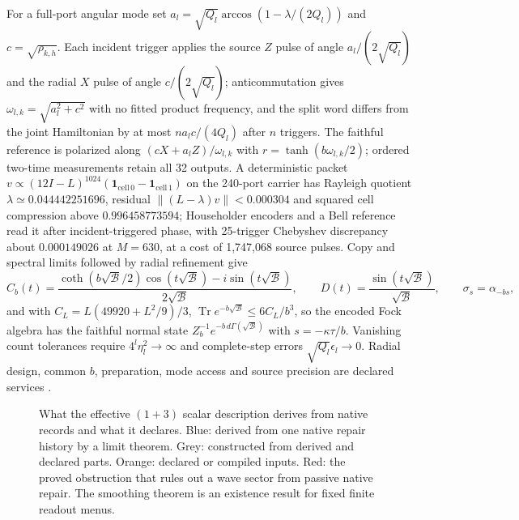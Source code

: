 \documentclass[11pt]{article}
\theoremstyle{definition}
\theoremstyle{remark}
\theoremstyle{plain}
\newcommand{\Tr}{\operatorname{Tr}}
\begin{document}
For a full-port angular mode set $a_l=\sqrt{Q_l}\arccos(1-\lambda/(2Q_l))$
and $c=\sqrt{\rho_{k,h}}$. Each incident trigger applies the source $Z$ pulse
of angle $a_l/(2\sqrt{Q_l})$ and the radial $X$ pulse of angle
$c/(2\sqrt{Q_l})$; anticommutation gives $\omega_{l,k}=\sqrt{a_l^2+c^2}$
with no fitted product frequency, and the split word differs from the joint
Hamiltonian by at most $na_lc/(4Q_l)$ after $n$ triggers. The faithful
reference is polarized along $(cX+a_lZ)/\omega_{l,k}$ with
$r=\tanh(b\omega_{l,k}/2)$; ordered two-time measurements retain all 32
outputs. A deterministic packet $v\propto(12I-L)^{1024}(\mathbf1_{\mathrm{cell}\,0}
-\mathbf1_{\mathrm{cell}\,1})$ on the 240-port carrier has Rayleigh quotient
$\lambda\simeq0.044442251696$, residual $\|(L-\lambda)v\|<0.000304$ and
squared cell compression above $0.996458773594$; Householder encoders and a
Bell reference read it after incident-triggered phase, with 25-trigger
Chebyshev discrepancy about $0.000149026$ at $M=630$, at a cost of 1,747,068
source pulses. Copy and spectral limits followed by radial refinement give
\[
 C_b(t)=\frac{\coth(b\sqrt{\mathcal B}/2)\cos(t\sqrt{\mathcal B})
                     -i\sin(t\sqrt{\mathcal B})}{2\sqrt{\mathcal B}},
 \qquad
 D(t)=\frac{\sin(t\sqrt{\mathcal B})}{\sqrt{\mathcal B}},
 \qquad \sigma_s=\alpha_{-bs},
\]
and with $C_L=L(49920+L^2/9)/3$, $\Tr e^{-b\sqrt{\mathcal B}}\le6C_L/b^3$,
so the encoded Fock algebra has the faithful normal state
$Z_b^{-1}e^{-b\,d\Gamma(\sqrt{\mathcal B})}$ with $s=-\kappa\tau/b$. Vanishing
count tolerances require $4^l\eta_l^2\to\infty$ and complete-step errors
$\sqrt{Q_l}\epsilon_l\to0$. Radial design, common $b$, preparation, mode
access and source precision are declared services \cite{nativeContinuum}.

\begin{figure}[!htb]
\centering

\caption{What the effective $(1+3)$ scalar description derives from native records and what it declares. Blue: derived from one native repair history by a limit theorem. Grey: constructed from derived and declared parts. Orange: declared or compiled inputs. Red: the proved obstruction that rules out a wave sector from passive native repair. The smoothing theorem is an existence result for fixed finite readout menus.}
\label{fig:field-chain}
\end{figure}
\end{document}
